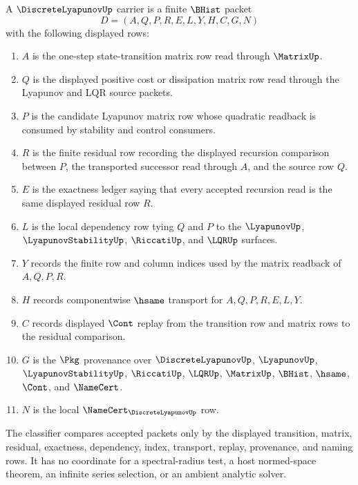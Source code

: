 \begin{definition}
\label{def:discrete-lyapunov-carrier}
A $\DiscreteLyapunovUp$ carrier is a finite $\BHist$ packet
$$
D=(A,Q,P,R,E,L,Y,H,C,G,N)
$$
with the following displayed rows:
\begin{enumerate}
\item $A$ is the one-step state-transition matrix row read through $\MatrixUp$.
\item $Q$ is the displayed positive cost or dissipation matrix row read through the Lyapunov and LQR source packets.
\item $P$ is the candidate Lyapunov matrix row whose quadratic readback is consumed by stability and control consumers.
\item $R$ is the finite residual row recording the displayed recursion comparison between $P$, the transported successor read through $A$, and the source row $Q$.
\item $E$ is the exactness ledger saying that every accepted recursion read is the same displayed residual row $R$.
\item $L$ is the local dependency row tying $Q$ and $P$ to the $\LyapunovUp$, $\LyapunovStabilityUp$, $\RiccatiUp$, and $\LQRUp$ surfaces.
\item $Y$ records the finite row and column indices used by the matrix readback of $A,Q,P,R$.
\item $H$ records componentwise $\hsame$ transport for $A,Q,P,R,E,L,Y$.
\item $C$ records displayed $\Cont$ replay from the transition row and matrix rows to the residual comparison.
\item $G$ is the $\Pkg$ provenance over $\DiscreteLyapunovUp$, $\LyapunovUp$, $\LyapunovStabilityUp$, $\RiccatiUp$, $\LQRUp$, $\MatrixUp$, $\BHist$, $\hsame$, $\Cont$, and $\NameCert$.
\item $N$ is the local $\NameCert_{\DiscreteLyapunovUp}$ row.
\end{enumerate}
The classifier compares accepted packets only by the displayed transition, matrix, residual, exactness, dependency, index, transport, replay, provenance, and naming rows. It has no coordinate for a spectral-radius test, a host normed-space theorem, an infinite series selection, or an ambient analytic solver.
\end{definition}

